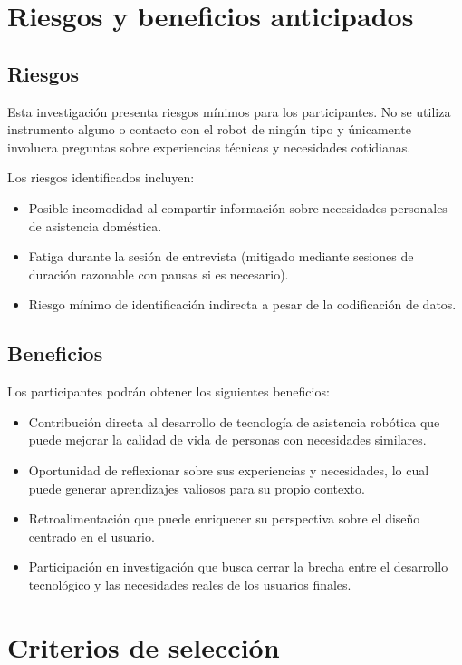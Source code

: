 \section*{Riesgos y beneficios anticipados}

\subsection*{Riesgos}
Esta investigación presenta riesgos mínimos para los participantes. No se utiliza instrumento alguno o contacto con el robot de ningún tipo y únicamente involucra preguntas sobre experiencias técnicas y necesidades cotidianas.

Los riesgos identificados incluyen:

\begin{itemize}
\item Posible incomodidad al compartir información sobre necesidades personales de asistencia doméstica.
\item Fatiga durante la sesión de entrevista (mitigado mediante sesiones de duración razonable con pausas si es necesario).
\item Riesgo mínimo de identificación indirecta a pesar de la codificación de datos.
\end{itemize}

\subsection*{Beneficios}
Los participantes podrán obtener los siguientes beneficios:

\begin{itemize}
\item Contribución directa al desarrollo de tecnología de asistencia robótica que puede mejorar la calidad de vida de personas con necesidades similares.
\item Oportunidad de reflexionar sobre sus experiencias y necesidades, lo cual puede generar aprendizajes valiosos para su propio contexto.
\item Retroalimentación que puede enriquecer su perspectiva sobre el diseño centrado en el usuario.
\item Participación en investigación que busca cerrar la brecha entre el desarrollo tecnológico y las necesidades reales de los usuarios finales.
\end{itemize}

\section*{Criterios de selección}

